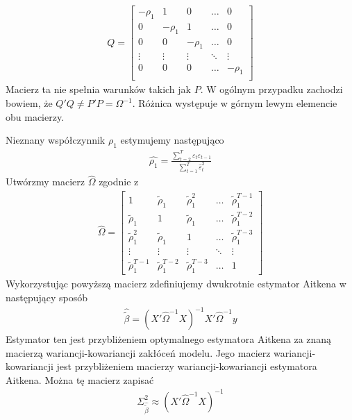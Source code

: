 \begin{gather*}
Q=
\begin{bmatrix}
 -\rho _1 & 1 & 0 & \ldots  & 0 \\
 0 & -\rho _1 & 1 & \ldots  & 0 \\
 0 & 0 & -\rho _1 & \ldots  & 0 \\
 \vdots  & \vdots  & \vdots  & \ddots & \vdots  \\
 0 & 0 & 0 & \ldots  & -\rho _1 \\
\end{bmatrix}
\end{gather*}
Macierz ta nie spełnia warunków takich jak $ P $. W ogólnym przypadku zachodzi bowiem, że $ Q'Q\neq P'P=\Omega^{-1} $. Różnica występuje w górnym lewym elemencie obu macierzy.

Nieznany współczynnik $ \rho_1 $ estymujemy następująco
\begin{gather*}
\hat{\rho_1}=\frac{\sum_{t=2}^{T}\varepsilon_t\varepsilon_{t-1}}{\sum_{t=1}^{T}\hat{\varepsilon}^2_t}
\end{gather*}
Utwórzmy macierz $ \hat \Omega $ zgodnie z
\begin{gather*}
\hat \Omega=\begin{bmatrix}
	1                 & \tilde{\rho }_1   & \tilde{\rho }_1^2 & \ldots & \tilde{\rho }_1^{T-1} \\
	\tilde{\rho }_1   & 1                 & \tilde{\rho }_1   & \ldots & \tilde{\rho }_1^{T-2} \\
	\tilde{\rho }_1^2 & \tilde{\rho }_1   & 1                 & \ldots & \tilde{\rho }_1^{T-3} \\
	\vdots            & \vdots            & \vdots            & \ddots & \vdots            \\
	\tilde{\rho }_1^{T-1} & \tilde{\rho }_1^{T-2} & \tilde{\rho }_1^{T-3} & \ldots & 1
\end{bmatrix}
\end{gather*}
Wykorzystując powyższą macierz zdefiniujemy dwukrotnie estymator Aitkena w następujący sposób
\begin{gather*}
\hat{ \tilde\beta}=\left(X'\hat \Omega^{-1}X\right)^{-1}X'\hat \Omega^{-1}y
\end{gather*}
Estymator ten jest przybliżeniem optymalnego estymatora Aitkena za znaną macierzą wariancji-kowariancji zakłóceń modelu. Jego macierz wariancji-kowariancji jest przybliżeniem macierzy wariancji-kowariancji estymatora Aitkena. Można tę macierz zapisać
\begin{gather*}
\Sigma^2_{\hat{\tilde{\beta}}}\approx\left(X'\hat \Omega^{-1}X\right)^{-1}
\end{gather*}
